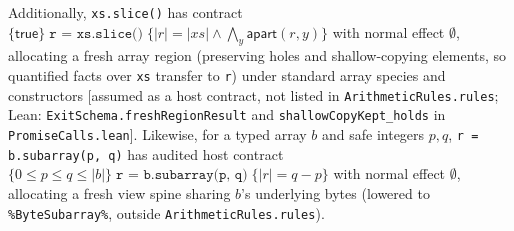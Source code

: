 \documentclass[10pt,a4paper]{article}
\theoremstyle{definition}
\theoremstyle{remark}
\newcommand{\kw}[1]{\mathsf{#1}}
\newcommand{\apart}{\kw{apart}}
\newcommand{\len}[1]{|#1|}
\newcommand{\hoare}[3]{\{#1\}\;#2\;\{#3\}}
\newcommand{\code}[1]{\texttt{#1}}
\newcommand{\lean}[1]{\texttt{\small #1}}
\newcommand{\status}[1]{\textsf{\small[#1]}}
\begin{document}
Additionally, \code{xs.slice()} has contract
$\hoare{\kw{true}}{\code{r = xs.slice()}}{\len r=\len{\mathit{xs}}\wedge\bigwedge_y\apart(r,y)}$
with normal effect $\emptyset$, allocating a fresh array region (preserving
holes and shallow-copying elements, so quantified facts over \code{xs}
transfer to \code{r}) under standard array species and constructors
\status{assumed as a host contract, not listed in \lean{ArithmeticRules.rules}; Lean: \lean{ExitSchema.freshRegionResult} and \lean{shallowCopyKept\_holds} in \lean{PromiseCalls.lean}}.
Likewise, for a typed array $b$ and safe integers $p,q$,
\code{r = b.subarray(p, q)} has audited host contract
$\hoare{0\le p\le q\le\len b}{\code{r = b.subarray(p, q)}}{\len r=q-p}$
with normal effect $\emptyset$, allocating a fresh view spine sharing
$b$'s underlying bytes (lowered to \code{\%ByteSubarray\%}, outside
\lean{ArithmeticRules.rules}).
\end{document}
